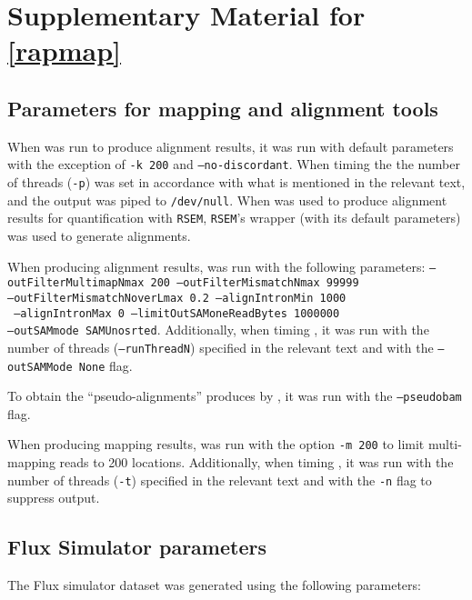 
\chapter{Supplementary Material for \cref{rapmap}} %
\label{appendix-rapmap}

\section{Parameters for mapping and alignment tools}
\label{subsec:params}

When \bt was run to produce alignment results, it was run with default parameters with the exception of \texttt{-k 200} and \texttt{--no-discordant}.  When timing \bt the the number of threads (\texttt{-p}) was set in accordance with what is mentioned in the relevant text, and the output was piped to \texttt{/dev/null}.  When \bt was used to produce alignment results for quantification with \texttt{RSEM}, \texttt{RSEM}'s \bt wrapper (with its default parameters) was used to generate alignments.

When producing alignment results, \STAR was run with the following parameters: \texttt{--outFilterMultimapNmax 200 --outFilterMismatchNmax 99999}\\
\texttt{--outFilterMismatchNoverLmax 0.2 --alignIntronMin 1000} \\
\texttt{ --alignIntronMax 0 --limitOutSAMoneReadBytes 1000000} \\ 
\texttt{--outSAMmode SAMUnosrted}.  Additionally, when timing \STAR, it was run with the number of threads (\texttt{--runThreadN}) specified in the relevant text and with the \texttt{--outSAMMode None} flag.


To obtain the ``pseudo-alignments'' produces by \kallisto, it was run with the \texttt{--pseudobam} flag.

When producing mapping results, \rapmap was run with the option \texttt{-m 200} to limit multi-mapping reads to 200 locations.  Additionally, when timing \rapmap, it was run with the number of threads (\texttt{-t}) specified in the relevant text and with the \texttt{-n} flag to suppress output.

\section{Flux Simulator parameters}
\label{subsec:flux_params}


The Flux simulator dataset was generated using the following parameters:

